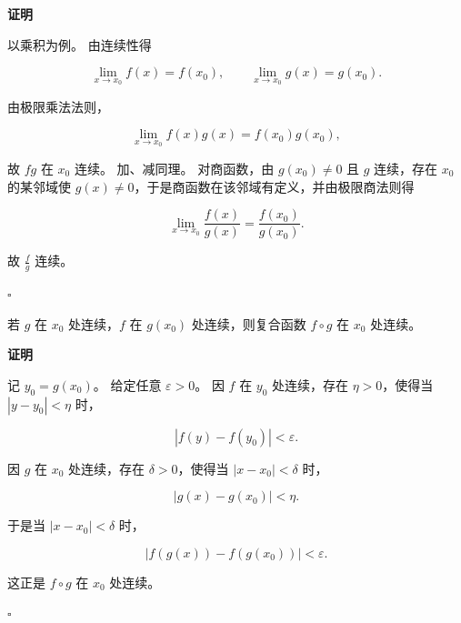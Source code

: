 \documentclass[fontset=fandol]{ctexart}
\newenvironment{proofdetail}{\par\noindent\textbf{证明}\quad}{\hfill$\square$\par\vspace{0.8em}}
\begin{document}
\begin{proofdetail}

以乘积为例。 由连续性得

\[

\lim_{x\to x_0}f(x)=f(x_0),\qquad \lim_{x\to x_0}g(x)=g(x_0).

\]

由极限乘法法则，

\[

\lim_{x\to x_0}f(x)g(x)=f(x_0)g(x_0),

\]

故 $fg$ 在 $x_0$ 连续。 加、减同理。 对商函数，由 $g(x_0)\neq0$ 且 $g$ 连续，存在 $x_0$ 的某邻域使 $g(x)\neq0$，于是商函数在该邻域有定义，并由极限商法则得

\[

\lim_{x\to x_0}\frac{f(x)}{g(x)}=\frac{f(x_0)}{g(x_0)}.

\]

故 $\frac{f}{g}$ 连续。

\end{proofdetail}



\begin{proposition}[复合函数连续性]

若 $g$ 在 $x_0$ 处连续，$f$ 在 $g(x_0)$ 处连续，则复合函数 $f\circ g$ 在 $x_0$ 处连续。

\end{proposition}

\begin{proofdetail}

记 $y_0=g(x_0)$。 给定任意 $\varepsilon>0$。 因 $f$ 在 $y_0$ 处连续，存在 $\eta>0$，使得当 $|y-y_0|<\eta$ 时，

\[

|f(y)-f(y_0)|<\varepsilon.

\]

因 $g$ 在 $x_0$ 处连续，存在 $\delta>0$，使得当 $|x-x_0|<\delta$ 时，

\[

|g(x)-g(x_0)|<\eta.

\]

于是当 $|x-x_0|<\delta$ 时，

\[

|f(g(x))-f(g(x_0))|<\varepsilon.

\]

这正是 $f\circ g$ 在 $x_0$ 处连续。

\end{proofdetail}
\end{document}
